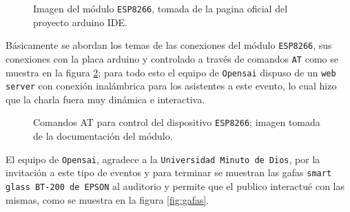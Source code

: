 \documentclass[jou]{apa6} %
\begin{document}
\begin{figure}[htb]
  \centering
\setlength\fboxsep{0pt}
\setlength\fboxrule{0.5pt}
  \caption{\footnotesize Imagen  del módulo \texttt{ESP8266}, tomada de la pagina oficial del proyecto  arduino  IDE.}
  \label{fig:ESP}  
\end{figure}

Básicamente se abordan los temas  de las conexiones del módulo \texttt{ESP8266}, sus conexiones con la placa arduino y controlado a través de comandos \texttt{AT} como se muestra en la figura \ref{fig:AT}; para todo esto el equipo de \texttt{Opensai} dispuso de un \texttt{web server} con conexión inalámbrica para los asistentes a este evento, lo cual hizo que la charla fuera muy dinámica e interactiva.
\\

\begin{figure}[htb]
  \centering
\setlength\fboxsep{0pt}
\setlength\fboxrule{0.5pt}
  \caption{\footnotesize Comandos AT para control del dispositivo \texttt{ESP8266}; imagen tomada de la documentación del módulo.}
  \label{fig:AT}  
\end{figure}

El equipo de \texttt{Opensai}, agradece a la \texttt{Universidad Minuto de Dios}, por la invitación a este tipo de eventos y para terminar se muestran las gafas \texttt{smart glass BT-200 de EPSON} al auditorio y permite que el publico interactué con las mismas, como se muestra en la figura \ref{fig:gafas}.
\end{document}
